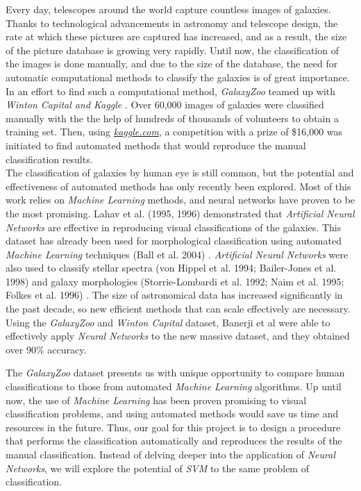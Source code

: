 \documentclass{vldb}
\begin{document}
Every day, telescopes around the world capture countless images of galaxies. Thanks to technological advancements in astronomy and telescope design, the rate at which these pictures are captured has increased, and as a result, the size of the picture database is growing very rapidly. Until now, the classification of the images is done manually, and due to the size of the database, the need for automatic computational methods to classify the galaxies is of great importance. \\

In an effort to find such a computational method, \emph{GalaxyZoo} teamed up with \emph{Winton Capital and Kaggle} \cite{kaggle}. Over 60,000 images of galaxies were classified manually with the the help of hundreds of thousands of volunteers to obtain a training set. Then, using \href{www.kaggle.com}{\emph{kaggle.com}}, a competition with a prize of \$16,000 was initiated to find automated methods that would reproduce the manual classification results. \\

The classification of galaxies by human eye is still common, but the potential and effectiveness of automated methods has only recently been explored. Most of this work relies on \emph{Machine Learning} methods, and neural networks have proven to be the most promising. Lahav et al. (1995, 1996) \cite{lavah95,lavah96} demonstrated that \emph{Artificial Neural Networks} are effective in reproducing visual classifications of the galaxies. This dataset has already been used for morphological classification using automated \emph{Machine Learning} techniques (Ball et al. 2004) \cite{ball04}. \emph{Artificial Neural Networks} were also used to classify stellar spectra (von Hippel et al. 1994; Bailer-Jones et al. 1998) \cite{vonHippel94,bailer98} and galaxy morphologies (Storrie-Lombardi et al. 1992; Naim et al. 1995; Folkes et al. 1996) \cite{storrie92, naim95, folkes96}. The size of astronomical data has increased significantly in the past decade, so new efficient methods that can scale effectively are necessary. Using the \emph{GalaxyZoo} and \emph{Winton Capital} dataset, Banerji et al \cite{banerji08} were able to effectively apply \emph{Neural Networks} to the new massive dataset, and they obtained over 90\% accuracy.


The \emph{GalaxyZoo} dataset presents us with unique opportunity to compare human classifications to those from automated \emph{Machine Learning} algorithms. Up until now, the use of \emph{Machine Learning} has been proven promising to visual classification problems, and using automated methods would save us time and resources in the future. Thus, our goal for this project is to design a procedure that performs the classification automatically and reproduces the results of the manual classification. Instead of delving deeper into the application of \emph{Neural Networks}, we will explore the potential of \emph{SVM} to the same problem of classification. \\
\end{document}
